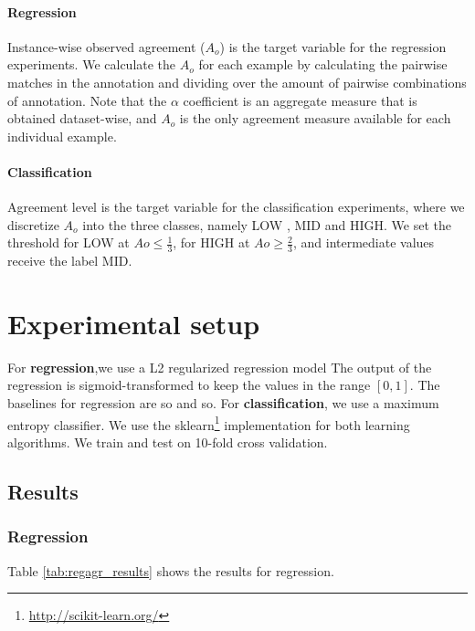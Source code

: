 \documentclass[11pt,a4paper]{article}
\begin{document}
\paragraph*{Regression} Instance-wise observed agreement ($A_o$) is the target variable for the regression experiments. We calculate  the $A_o$ for each example by calculating the pairwise matches in the annotation and dividing over the amount of pairwise combinations of annotation. 
Note that the $\alpha$ coefficient is an aggregate measure that is obtained dataset-wise, and $A_o$ is the only agreement measure available for each individual example.
\paragraph*{Classification} Agreement level is the target variable for the classification experiments, where we discretize $A_o$ into the three classes, namely LOW , MID and HIGH. We set the threshold for LOW at $Ao \le \frac{1}{3}$, for HIGH at $Ao \ge \frac{2}{3}$, and intermediate values receive the label MID.


\section{Experimental setup}
For \textbf{regression},we use a L2 regularized regression model
The output of the regression is sigmoid-transformed to keep the values in the range $[0,1]$. The baselines for regression are so and  so. For \textbf{classification}, we use a maximum entropy classifier. We use the sklearn\footnote{\url{http://scikit-learn.org/}} implementation for both learning algorithms. We train and test  on 10-fold cross validation. 


\subsection{Results}
\subsubsection{Regression}

Table \ref{tab:regagr_results} shows the results for regression.
\end{document}
